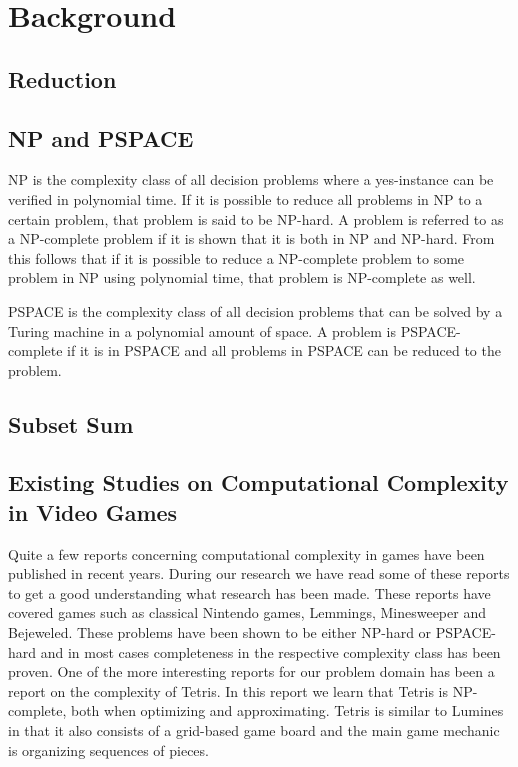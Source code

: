 \section{Background}

\subsection{Reduction}

\subsection{NP and PSPACE}
NP is the complexity class of all decision problems where a yes-instance can be verified in polynomial time. If it is possible to reduce all problems in NP to a certain problem, that problem is said to be NP-hard. A problem is referred to as a NP-complete problem if it is shown that it is both in NP and NP-hard. From this follows that if it is possible to reduce a NP-complete problem to some problem in NP using polynomial time, that problem is NP-complete as well.

PSPACE is the complexity class of all decision problems that can be solved by a Turing machine in a polynomial amount of space. A problem is PSPACE-complete if it is in PSPACE and all problems in PSPACE can be reduced to the problem.
\subsection{Subset Sum}


\subsection{Existing Studies on Computational Complexity in Video Games}

Quite a few reports concerning computational complexity in games have been published in recent years. During our research we have read some of these reports to get a good understanding what research has been made. These reports have covered games such as classical Nintendo games, 
Lemmings, Minesweeper and Bejeweled. These problems have been shown to be either NP-hard or PSPACE-hard and in most cases completeness in the respective complexity class has been proven.
One of the more interesting reports for our problem domain has been a report on the complexity of Tetris. In this report we learn that Tetris is NP-complete, both when optimizing and approximating. Tetris is similar to Lumines in that it also consists of a grid-based game board and the main game mechanic is organizing sequences of pieces.

